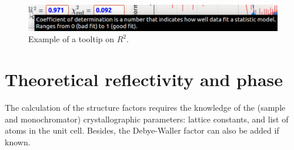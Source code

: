 \documentclass[oldfontcommands,openany,oneside]{memoir}
\begin{document}
\begin{figure}[!h]
  \centering
  \includegraphics[width=\textwidth]{img/Screenshot_Tooltip.pdf}
  \caption{Example of a tooltip on $R^2$.}
  \label{fig:tooltip}
\end{figure}

\chapter{Theoretical reflectivity and phase} \label{chap:structureFactor}
The calculation of the structure factors requires the knowledge of the (sample and monochromator) crystallographic parameters: lattice constants, and list of atoms in the unit cell. Besides, the Debye-Waller factor can also be added if known. 
\end{document}
